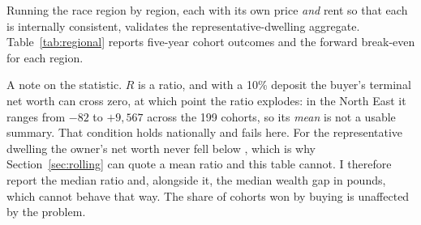 Running the race region by region, each with its own price \emph{and} rent so that each is internally consistent, validates the representative-dwelling aggregate. Table~\ref{tab:regional} reports five-year cohort outcomes and the forward break-even for each region.

A note on the statistic. $R$ is a ratio, and with a 10\% deposit the buyer's terminal net worth can cross zero, at which point the ratio explodes: in the North East it ranges from $-82$ to $+9{,}567$ across the 199 cohorts, so its \emph{mean} is not a usable summary. That condition holds nationally and fails here. For the representative dwelling the owner's net worth never fell below , which is why Section~\ref{sec:rolling} can quote a mean ratio and this table cannot. I therefore report the median ratio and, alongside it, the median wealth gap in pounds, which cannot behave that way. The share of cohorts won by buying is unaffected by the problem.

